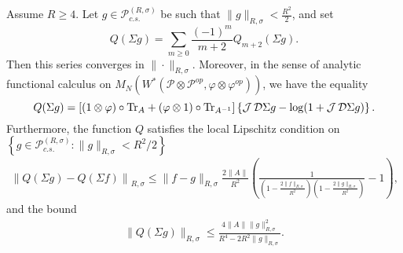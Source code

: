 \begin{lem}\label{Q_2}
Assume $R\geq4$. Let $g\in\mathscr{P}^{(R,\sigma)}_{c.s.}$ be such that $\|g\|_{R,\sigma}<\frac{R^2}{2}$, and set
	\begin{equation*}
		Q(\Sigma g)=\sum_{m\geq 0} \frac{(-1)^m}{m+2}Q_{m+2}(\Sigma g).
	\end{equation*}
Then this series converges in $\|\cdot\|_{R,\sigma}$. Moreover, in the sense of analytic functional calculus on $M_{N}(W^*(\mathscr{P}\otimes \mathscr{P}^{op},\varphi\otimes\varphi^{op}))$, we have the equality
	\begin{equation*}
		Q(\Sigma g)=\left[ (1\otimes\varphi)\circ\text{Tr}_{A}+(\varphi\otimes 1)\circ\text{Tr}_{A^{-1}} \right] \left\{ \operatorname{\mathcal J}\mathcal D \Sigma g - \log(1+\operatorname{\mathcal J}\mathcal D\Sigma g)\right\}.
	\end{equation*}
Furthermore, the function $Q$ satisfies the local Lipschitz condition on $\left\{g\in\mathscr{P}^{(R,\sigma)}_{c.s.}\colon \|g\|_{R,\sigma} < R^2/2\right\}$
	\begin{align*}
		\left\| Q(\Sigma g)-Q(\Sigma f)\right\|_{R,\sigma} \leq \| f-g\|_{R,\sigma} \frac{2\|A\|}{R^2} \left( \frac{1}{\left(1-\frac{2\|f\|_{R,\sigma}}{R^2}\right)\left(1-\frac{2\|g\|_{R,\sigma}}{R^2}\right)} - 1\right),
	\end{align*}
and the bound
	\begin{align*}
		\|Q(\Sigma g)\|_{R,\sigma} \leq \frac{ 4\|A\| \|g\|_{R,\sigma}^2}{R^4-2R^2 \|g\|_{R,\sigma}}.
	\end{align*}
\end{lem}
